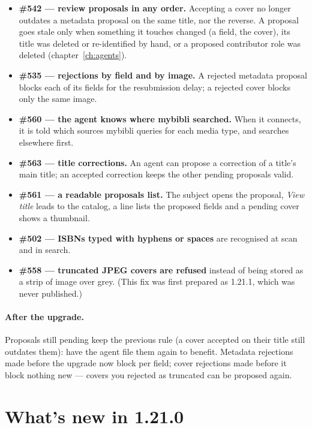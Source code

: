 \begin{itemize}
  \item \textbf{\#542 \string— review proposals in any order.} Accepting
        a cover no longer outdates a metadata proposal on the same title,
        nor the reverse. A proposal goes stale only when something it
        touches changed (a field, the cover), its title was deleted or
        re-identified by hand, or a proposed contributor role was
        deleted (chapter~\ref{ch:agents}).
  \item \textbf{\#535 \string— rejections by field and by image.} A
        rejected metadata proposal blocks each of its fields for the
        resubmission delay; a rejected cover blocks only the same image.
  \item \textbf{\#560 \string— the agent knows where mybibli searched.}
        When it connects, it is told which sources mybibli queries for
        each media type, and searches elsewhere first.
  \item \textbf{\#563 \string— title corrections.} An agent can propose
        a correction of a title's main title; an accepted correction
        keeps the other pending proposals valid.
  \item \textbf{\#561 \string— a readable proposals list.} The subject
        opens the proposal, \emph{View title} leads to the catalog, a
        line lists the proposed fields and a pending cover shows a
        thumbnail.
  \item \textbf{\#502 \string— ISBNs typed with hyphens or spaces} are
        recognised at scan and in search.
  \item \textbf{\#558 \string— truncated JPEG covers are refused}
        instead of being stored as a strip of image over grey. (This fix
        was first prepared as 1.21.1, which was never published.)
\end{itemize}

\paragraph{After the upgrade.} Proposals still pending keep the
previous rule (a cover accepted on their title still outdates them):
have the agent file them again to benefit. Metadata rejections made
before the upgrade now block per field; cover rejections made before it
block nothing new --- covers you rejected as truncated can be proposed
again.

\section{What's new in 1.21.0}\label{sec:whats-new-1.21.0}

